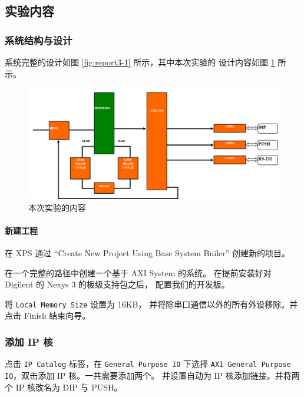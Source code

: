\documentclass{ctexart}
\begin{document}
        \subsection{实验内容}

        \subsubsection{系统结构与设计}

        系统完整的设计如图 \ref{fig:report3-1} 所示，其中本次实验的
        设计内容如图 \ref{fig:report3-3} 所示。
      
        \begin{figure}[h!]
          \centering
          \includegraphics{report3-3}
          \caption{本次实验的内容}
          \label{fig:report3-3}
        \end{figure}
        
        \paragraph{新建工程}
        
        在 XPS 通过 “Create New Project Using Base System Builer” 创建新的项目。
        
        在一个完整的路径中创建一个基于 AXI System 的系统。
        在提前安装好对 Digilent 的 Nexys 3 的板级支持包之后，
        配置我们的开发板。
        
        将 \verb|Local Memory Size| 设置为 16KB，
        并将除串口通信以外的所有外设移除。并点击 Finish
        结束向导。
        
        \subsubsection{添加 IP 核}

        点击 \verb|IP Catalog| 标签，在 \verb|General Purpose IO| 下选择
        \verb|AXI General Purpose IO|，双击添加 IP 核。一共需要添加两个。
        并设置自动为 IP 核添加链接。并将两个 IP 核改名为 DIP 与 PUSH。
\end{document}
